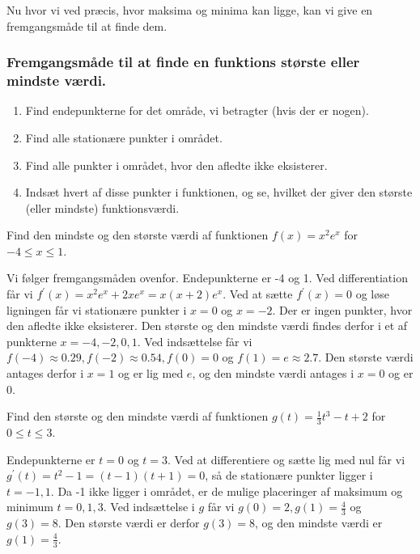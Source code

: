 Nu hvor vi ved præcis, hvor maksima og minima kan ligge, kan vi give en fremgangsmåde til at finde dem.

\subsubsection*{Fremgangsmåde til at finde en funktions største eller mindste værdi.}
\begin{enumerate}
  \item Find endepunkterne for det område, vi betragter (hvis der er nogen).
  \item Find alle stationære punkter i området.
  \item Find alle punkter i området, hvor den afledte ikke eksisterer.
  \item Indsæt hvert af disse punkter i funktionen, og se, hvilket der giver den største (eller mindste) funktionsværdi.
\end{enumerate}

\begin{example}

    Find den mindste og den største værdi af funktionen $f(x)=x^{2} e^{x}$ for $-4 \leq x \leq 1$.
\end{example}

\begin{solution} Vi følger fremgangsmåden ovenfor. Endepunkterne er -4 og 1. Ved differentiation får vi $f^{\prime}(x)=x^{2} e^{x}+2 x e^{x}=x(x+2) e^{x}$. Ved at sætte $f^{\prime}(x)=0$ og løse ligningen får vi stationære punkter i $x=0$ og $x=-2$. Der er ingen punkter, hvor den afledte ikke eksisterer. Den største og den mindste værdi findes derfor i et af punkterne $x=-4,-2,0,1$. Ved indsættelse får vi $f(-4) \approx 0.29, f(-2) \approx 0.54, f(0)=0$ og $f(1)=e \approx 2.7$. Den største værdi antages derfor i $x=1$ og er lig med $e$, og den mindste værdi antages i $x=0$ og er 0.
\end{solution}

\begin{example}

    Find den største og den mindste værdi af funktionen $g(t)=\frac{1}{3} t^{3}-t+2$ for $0 \leq t \leq 3$.
\end{example}

\begin{solution} Endepunkterne er $t=0$ og $t=3$. Ved at differentiere og sætte lig med nul får vi $g^{\prime}(t)=t^{2}-1=(t-1)(t+1)=0$, så de stationære punkter ligger i $t=-1,1$. Da -1 ikke ligger i området, er de mulige placeringer af maksimum og minimum $t=0,1,3$. Ved indsættelse i $g$ får vi $g(0)=2, g(1)=\frac{4}{3}$ og $g(3)=8$. Den største værdi er derfor $g(3)=8$, og den mindste værdi er $g(1)=\frac{4}{3}$.
\end{solution}

